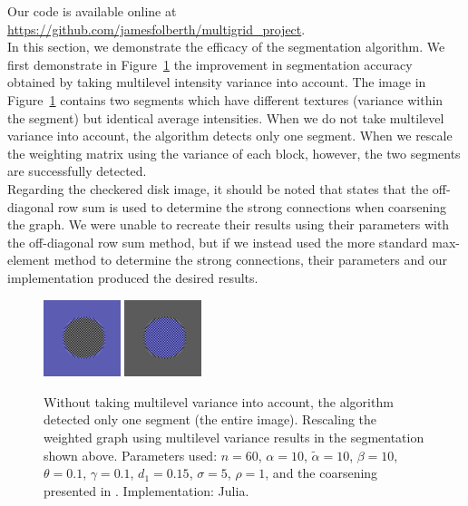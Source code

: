 \documentclass[12pt]{article}%
\begin{document}
Our code is available online at \url{https://github.com/jamesfolberth/multigrid_project}.\\

In this section, we demonstrate the efficacy of the segmentation algorithm. We first demonstrate in Figure~\ref{fig:disk} the improvement in segmentation accuracy obtained by taking multilevel intensity variance into account. The image in Figure~\ref{fig:disk} contains two segments which have different textures (variance within the segment) but identical average intensities. When we do not take multilevel variance into account, the algorithm detects only one segment. When we rescale the weighting matrix using the variance of each block, however, the two segments are successfully detected.\\

Regarding the checkered disk image, it should be noted that \cite{inglis:2010} states that the off-diagonal row sum is used to determine the strong connections when coarsening the graph.  We were unable to recreate their results using their parameters with the off-diagonal row sum method, but if we instead used the more standard max-element method to determine the strong connections, their parameters and our implementation produced the desired results.\\

\begin{figure}[ht]
\centering
\includegraphics[width=0.2\textwidth,height=0.2\textwidth]{checker_disk_good_seg_1.png} \hspace{.45cm}
\includegraphics[width=0.2\textwidth,height=0.2\textwidth]{checker_disk_good_seg_2.png}
\caption{Without taking multilevel variance into account, the algorithm detected only one segment (the entire image). Rescaling the weighted graph using multilevel variance results in the segmentation shown above. Parameters used: $n = 60$, $\alpha = 10$, $\tilde{\alpha} = 10$, $\beta = 10$, $\theta = 0.1$, $\gamma = 0.1$, $d_1 = 0.15$, $\sigma = 5$, $\rho = 1$, and the coarsening presented in \cite{inglis:2010}.  Implementation: Julia.}
\label{fig:disk}
\end{figure}
\end{document}
